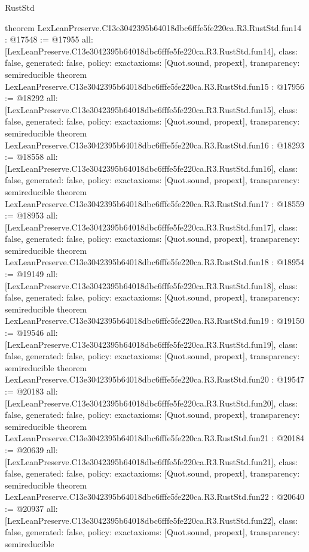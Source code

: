 \begin{lexlean}{RustStd}
\begin{coremodule}
{}
theorem LexLeanPreserve.C13e3042395b64018dbc6fffe5fe220ca.R3.RustStd.fun14 : @17548 := @17955 {
  all: [LexLeanPreserve.C13e3042395b64018dbc6fffe5fe220ca.R3.RustStd.fun14],
  class: false,
  generated: false,
  policy: exact{axioms: [Quot.sound, propext]},
  transparency: semireducible
}
theorem LexLeanPreserve.C13e3042395b64018dbc6fffe5fe220ca.R3.RustStd.fun15 : @17956 := @18292 {
  all: [LexLeanPreserve.C13e3042395b64018dbc6fffe5fe220ca.R3.RustStd.fun15],
  class: false,
  generated: false,
  policy: exact{axioms: [Quot.sound, propext]},
  transparency: semireducible
}
theorem LexLeanPreserve.C13e3042395b64018dbc6fffe5fe220ca.R3.RustStd.fun16 : @18293 := @18558 {
  all: [LexLeanPreserve.C13e3042395b64018dbc6fffe5fe220ca.R3.RustStd.fun16],
  class: false,
  generated: false,
  policy: exact{axioms: [Quot.sound, propext]},
  transparency: semireducible
}
theorem LexLeanPreserve.C13e3042395b64018dbc6fffe5fe220ca.R3.RustStd.fun17 : @18559 := @18953 {
  all: [LexLeanPreserve.C13e3042395b64018dbc6fffe5fe220ca.R3.RustStd.fun17],
  class: false,
  generated: false,
  policy: exact{axioms: [Quot.sound, propext]},
  transparency: semireducible
}
theorem LexLeanPreserve.C13e3042395b64018dbc6fffe5fe220ca.R3.RustStd.fun18 : @18954 := @19149 {
  all: [LexLeanPreserve.C13e3042395b64018dbc6fffe5fe220ca.R3.RustStd.fun18],
  class: false,
  generated: false,
  policy: exact{axioms: [Quot.sound, propext]},
  transparency: semireducible
}
theorem LexLeanPreserve.C13e3042395b64018dbc6fffe5fe220ca.R3.RustStd.fun19 : @19150 := @19546 {
  all: [LexLeanPreserve.C13e3042395b64018dbc6fffe5fe220ca.R3.RustStd.fun19],
  class: false,
  generated: false,
  policy: exact{axioms: [Quot.sound, propext]},
  transparency: semireducible
}
theorem LexLeanPreserve.C13e3042395b64018dbc6fffe5fe220ca.R3.RustStd.fun20 : @19547 := @20183 {
  all: [LexLeanPreserve.C13e3042395b64018dbc6fffe5fe220ca.R3.RustStd.fun20],
  class: false,
  generated: false,
  policy: exact{axioms: [Quot.sound, propext]},
  transparency: semireducible
}
theorem LexLeanPreserve.C13e3042395b64018dbc6fffe5fe220ca.R3.RustStd.fun21 : @20184 := @20639 {
  all: [LexLeanPreserve.C13e3042395b64018dbc6fffe5fe220ca.R3.RustStd.fun21],
  class: false,
  generated: false,
  policy: exact{axioms: [Quot.sound, propext]},
  transparency: semireducible
}
theorem LexLeanPreserve.C13e3042395b64018dbc6fffe5fe220ca.R3.RustStd.fun22 : @20640 := @20937 {
  all: [LexLeanPreserve.C13e3042395b64018dbc6fffe5fe220ca.R3.RustStd.fun22],
  class: false,
  generated: false,
  policy: exact{axioms: [Quot.sound, propext]},
  transparency: semireducible
}
\end{coremodule}
\end{lexlean}
